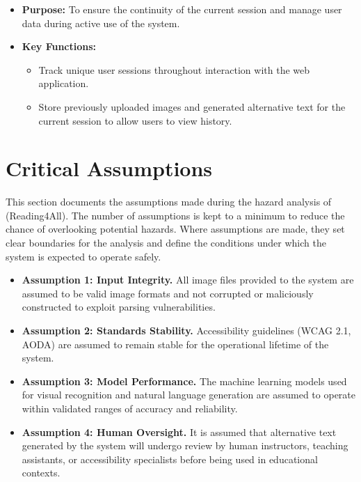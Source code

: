 \documentclass{article}
\begin{document}
\begin{enumerate}
\begin{itemize}
      \item \textbf{Purpose:} To ensure the continuity of the current
        session and manage user data during active use of the system.
      \item \textbf{Key Functions:}
        \begin{itemize}
          \item Track unique user sessions throughout interaction
            with the web application.
          \item Store previously uploaded images and generated
            alternative text for the current session to allow users
            to view history.
        \end{itemize}
    \end{itemize}
\end{enumerate}
\section{Critical Assumptions}
This section documents the assumptions made during the hazard analysis of
\progname{} (Reading4All). The number of assumptions is kept to a minimum
to reduce the chance of overlooking potential hazards. Where assumptions
are made, they set clear boundaries for the analysis and define the
conditions under which the system is expected to operate safely.

\begin{itemize}
  \item \textbf{Assumption 1: Input Integrity.} All image files provided
    to the system are assumed to be valid image formats and not corrupted
    or maliciously constructed to exploit parsing vulnerabilities.

  \item \textbf{Assumption 2: Standards Stability.} Accessibility
    guidelines (WCAG 2.1, AODA) are assumed to remain stable for the
    operational lifetime of the system.

  \item \textbf{Assumption 3: Model Performance.} The machine learning
    models used for visual recognition and natural language generation are
    assumed to operate within validated ranges of accuracy and reliability.

  \item \textbf{Assumption 4: Human Oversight.} It is assumed that
    alternative text generated by the system will undergo review by human
    instructors, teaching assistants, or accessibility specialists before
    being used in educational contexts.
\end{itemize}
\end{document}
